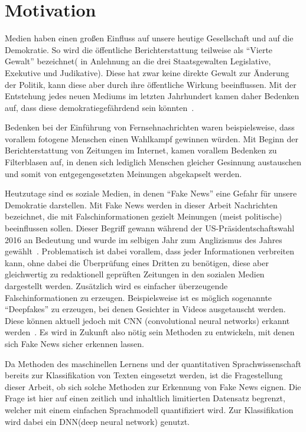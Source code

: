 \chapter{Motivation}
\label{chap:moti}
Medien haben einen großen Einfluss auf unsere heutige Gesellschaft und auf die Demokratie.
So wird die öffentliche Berichterstattung teilweise als \enquote{Vierte Gewalt} bezeichnet( 
in Anlehnung an die drei Staatsgewalten Legislative, Exekutive und Judikative). Diese hat 
zwar keine direkte Gewalt zur Änderung der Politik, kann diese aber durch ihre öffentliche 
Wirkung beeinflussen. Mit der Entstehung jedes neuen Mediums im letzten Jahrhundert kamen daher 
Bedenken auf, dass diese demokratiegefährdend sein könnten~\cite{hunt_fake}.
 
Bedenken bei der Einführung von Fernsehnachrichten waren beispielsweise, dass vorallem fotogene Menschen
einen Wahlkampf gewinnen würden. Mit Beginn der Berichterstattung von Zeitungen im Internet,
kamen vorallem Bedenken zu Filterblasen auf, in denen sich lediglich Menschen gleicher 
Gesinnung austauschen und somit von entgegengesetzten Meinungen abgekapselt werden.

Heutzutage sind es soziale Medien, in denen \enquote{Fake News} eine Gefahr für unsere Demokratie 
darstellen. Mit Fake News werden in dieser Arbeit Nachrichten bezeichnet, die mit Falschinformationen
gezielt Meinungen (meist politische) beeinflussen sollen. Dieser Begriff gewann während der 
US-Präsidentschaftswahl 2016 an Bedeutung und wurde im selbigen Jahr zum Anglizismus des Jahres gewählt~\cite{nzz}.
Problematisch ist dabei vorallem, dass jeder Informationen verbreiten 
kann, ohne dabei die Überprüfung eines Dritten zu benötigen, diese aber gleichwertig
zu redaktionell geprüften Zeitungen in den sozialen Medien dargestellt werden. Zusätzlich 
wird es einfacher überzeugende Falschinformationen zu erzeugen. Beispielsweise ist es möglich
sogenannte \enquote{Deepfakes} zu erzeugen, bei denen Gesichter in Videos ausgetauscht werden.
Diese können aktuell jedoch mit CNN (convolutional neural networks) erkannt werden~\cite{deepfake}.
Es wird in Zukunft also nötig sein Methoden zu entwickeln, mit denen sich Fake News sicher erkennen lassen.

Da Methoden des maschinellen Lernens und der quantitativen Sprachwissenschaft bereits zur Klassifikation
von Texten eingesetzt werden, ist die Fragestellung dieser Arbeit, ob sich solche Methoden zur Erkennung 
von Fake News eignen. Die Frage ist hier auf einen zeitlich und inhaltlich 
limitierten Datensatz begrenzt, welcher mit einem einfachen Sprachmodell quantifiziert wird.
Zur Klassifikation wird dabei ein DNN(deep neural network) genutzt.